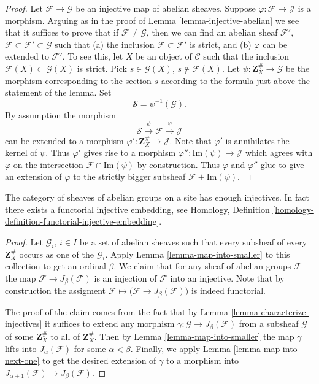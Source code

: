 \begin{proof}
Let $\mathcal{F} \to \mathcal{G}$ be an injective map
of abelian sheaves. Suppose $\varphi : \mathcal{F} \to \mathcal{J}$
is a morphism. Arguing as in the proof of
Lemma \ref{lemma-injective-abelian} we see that it suffices
to prove that if $\mathcal{F} \not = \mathcal{G}$, then we
can find an abelian sheaf $\mathcal{F}'$,
$\mathcal{F} \subset \mathcal{F}' \subset \mathcal{G}$
such that (a) the inclusion $\mathcal{F} \subset \mathcal{F}'$ is strict,
and (b) $\varphi$ can be extended to $\mathcal{F}'$.
To see this, let $X$ be an object of $\mathcal{C}$ such
that the inclusion $\mathcal{F}(X) \subset \mathcal{G}(X)$
is strict. Pick $s \in \mathcal{G}(X)$, $s \not \in \mathcal{F}(X)$.
Let $\psi : \mathbf{Z}_X^\# \to \mathcal{G}$ be the morphism corresponding
to the section $s$ according to the formula just above the statement
of the lemma. Set
$$
\mathcal{S} = \psi^{-1}(\mathcal{G}).
$$
By assumption the morphism
$$
\mathcal{S} \xrightarrow{\psi} \mathcal{F} \xrightarrow{\varphi} \mathcal{J}
$$
can be extended to a morphism $\varphi' : \mathbf{Z}_X^\# \to \mathcal{J}$.
Note that $\varphi'$ is annihilates the kernel of $\psi$. Thus
$\varphi'$ gives rise to a morphism
$\varphi'' : \text{Im}(\psi) \to \mathcal{J}$
which agrees with $\varphi$ on the intersection
$\mathcal{F} \cap \text{Im}(\psi)$ by construction.
Thus $\varphi$ and $\varphi''$ glue to give an extension
of $\varphi$ to the strictly bigger subsheaf
$\mathcal{F} + \text{Im}(\psi)$.
\end{proof}

\begin{theorem}
\label{theorem-sheaves-injectives}
The category of sheaves of abelian groups on a
site has enough injectives. In fact there exists
a functorial injective embedding, see
Homology, Definition \ref{homology-definition-functorial-injective-embedding}.
\end{theorem}

\begin{proof}
Let $\mathcal{G}_i$, $i\in I$ be a set of abelian
sheaves such that every subsheaf of every $\mathbf{Z}_X^\#$
occurs as one of the $\mathcal{G}_i$. Apply
Lemma \ref{lemma-map-into-smaller} to this collection to
get an ordinal $\beta$. We claim that for any sheaf of abelian
groups $\mathcal{F}$ the map $\mathcal{F} \to J_\beta(\mathcal{F})$
is an injection of $\mathcal{F}$ into an injective.
Note that by construction the assigment
$\mathcal{F} \mapsto \big(\mathcal{F} \to J_\beta(\mathcal{F})\big)$
is indeed functorial.

\medskip\noindent
The proof of the claim comes from the fact that by
Lemma \ref{lemma-characterize-injectives} it suffices to extend any
morphism $\gamma : \mathcal{G} \to J_\beta(\mathcal{F})$ 
from a subsheaf $\mathcal{G}$ of some $\mathbf{Z}_X^\#$ to all of
$\mathbf{Z}_X^\#$. Then by Lemma \ref{lemma-map-into-smaller} the
map $\gamma$ lifts into $J_\alpha(\mathcal{F})$ for some
$\alpha < \beta$. Finally, we apply Lemma \ref{lemma-map-into-next-one}
to get the desired extension of $\gamma$ to a morphism
into $J_{\alpha+1}(\mathcal{F}) \to J_\beta(\mathcal{F})$.
\end{proof}


